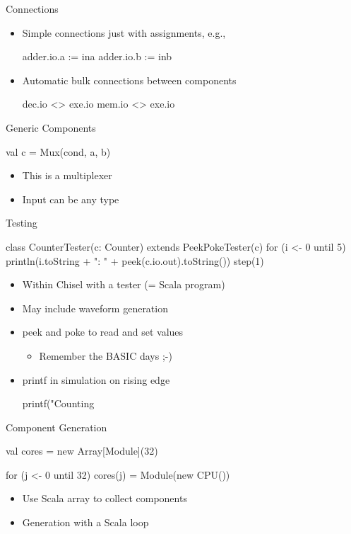 \documentclass[xcolor=pdflatex,dvipsnames,table]{beamer}
\begin{document}
\begin{frame}[fragile]{Connections}
\begin{itemize}
\item Simple connections just with assignments, e.g.,
\begin{chisel}
  adder.io.a := ina
  adder.io.b := inb
\end{chisel}
\item Automatic bulk connections between components
\begin{chisel}
  dec.io <> exe.io
  mem.io <> exe.io
\end{chisel}
\end{itemize}
\end{frame}

\begin{frame}[fragile]{Generic Components}
\begin{chisel}
val c = Mux(cond, a, b)
\end{chisel}
\begin{itemize}
\item This is a multiplexer
\item Input can be any type
\end{itemize}
\end{frame}

\begin{frame}[fragile]{Testing}
\begin{chisel}
class CounterTester(c: Counter) extends PeekPokeTester(c) {
  for (i <- 0 until 5) {
    println(i.toString + ": " + peek(c.io.out).toString())
    step(1)
  }
}
\end{chisel}
\begin{itemize}
\item Within Chisel with a tester (= Scala program)
\item May include waveform generation
\item peek and poke to read and set values
\begin{itemize}
\item Remember the BASIC days ;-)
\end{itemize}
\item printf in simulation on rising edge
\begin{chisel}
printf("Counting %
\end{chisel}
\end{itemize}
\end{frame}

\begin{frame}[fragile]{Component Generation}
\begin{chisel}
val cores = new Array[Module](32)

for (j <- 0 until 32)
  cores(j) = Module(new CPU())
\end{chisel}
\begin{itemize}
\item Use Scala array to collect components
\item Generation with a Scala loop
\end{itemize}
\end{frame}
\end{document}
